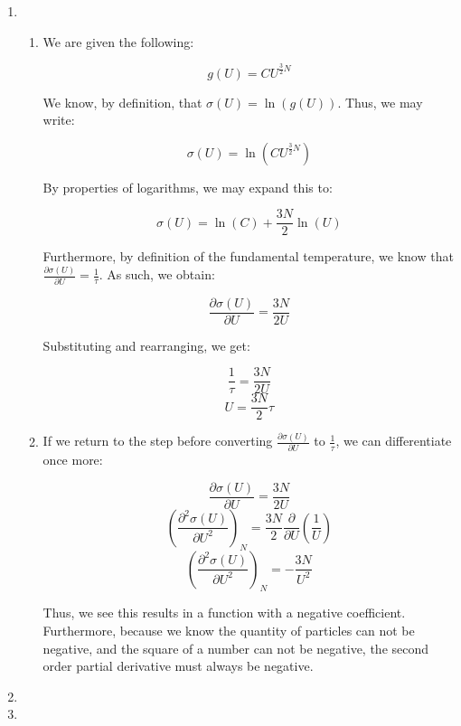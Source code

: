 \begin{enumerate}

  \item

    \begin{enumerate}

      \item 

        We are given the following:

        $$g(U)=CU^{\frac{3}{2}N}$$

        We know, by definition, that $\sigma(U)=\ln(g(U))$. Thus, we may write:

        $$\sigma(U)=\ln(CU^{\frac{3}{2}N})$$

        By properties of logarithms, we may expand this to:

        $$\sigma(U)=\ln(C)+\frac{3N}{2}\ln(U)$$

        Furthermore, by definition of the fundamental temperature, we know that $\displaystyle\frac{\partial\sigma(U)}{\partial U}=\frac{1}{\tau}$. As such, we obtain:

        $$\frac{\partial \sigma(U)}{\partial U}=\frac{3N}{2U}$$

        Substituting and rearranging, we get:

        $$\frac{1}{\tau}=\frac{3N}{2U}$$
        $$\boxed{U=\frac{3N}{2}\tau}$$

      \item 

        If we return to the step before converting $\displaystyle\frac{\partial\sigma(U)}{\partial U}$ to $\frac{1}{\tau}$, we can differentiate once more:

        $$\frac{\partial \sigma(U)}{\partial U}=\frac{3N}{2U}$$
        $$\left(\frac{\partial^2\sigma(U)}{\partial U^2}\right)_N=\frac{3N}{2}\frac{\partial}{\partial U}\left( \frac{1}{U} \right)$$
        $$\boxed{\left(\frac{\partial^2\sigma(U)}{\partial U^2}\right)_N=-\frac{3N}{U^2}}$$

        Thus, we see this results in a function with a negative coefficient. Furthermore, because we know the quantity of particles can not be negative, and the square of a number can not be negative, the second order partial derivative must always be negative.

    \end{enumerate}

  \item
    
  \item


\end{enumerate}
